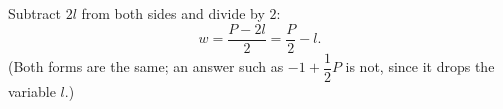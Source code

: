 Subtract $2l$ from both sides and divide by $2$:
\[w=\dfrac{P-2l}{2}=\boxed{\dfrac{P}{2}-l}.\]
(Both forms are the same; an answer such as $-1+\dfrac{1}{2}P$ is not, since it drops the variable $l$.)

